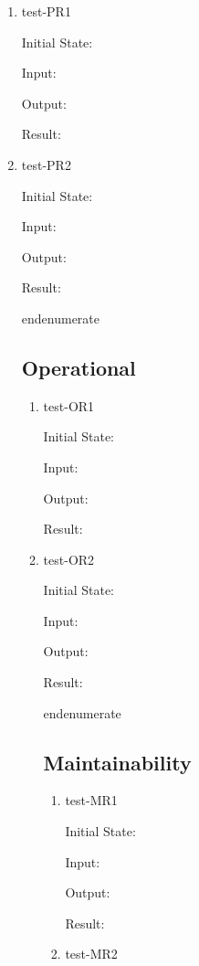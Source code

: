 \documentclass[12pt, titlepage]{article}
\begin{document}
\begin{enumerate}
\begin{enumerate}
\begin{enumerate}

  \item{test-PR1} \label{test-PR1}

  Initial State:

  Input:

  Output:

  Result:

  \item{test-PR2} \label{test-PR2}

  Initial State:

  Input:

  Output:

  Result:

end{enumerate}

\subsection{Operational} \label{section:4.4}

\begin{enumerate}

  \item{test-OR1} \label{test-OR1}

  Initial State:

  Input:

  Output:

  Result:

  \item{test-OR2} \label{test-OR2}

  Initial State:

  Input:

  Output:

  Result:

end{enumerate}

\subsection{Maintainability} \label{section:4.5}

\begin{enumerate}

  \item{test-MR1} \label{test-MR1}

  Initial State:

  Input:

  Output:

  Result:

  \item{test-MR2} \label{test-MR2}


\end{enumerate}
\end{enumerate}
\end{enumerate}
\end{enumerate}
\end{enumerate}
\end{document}
